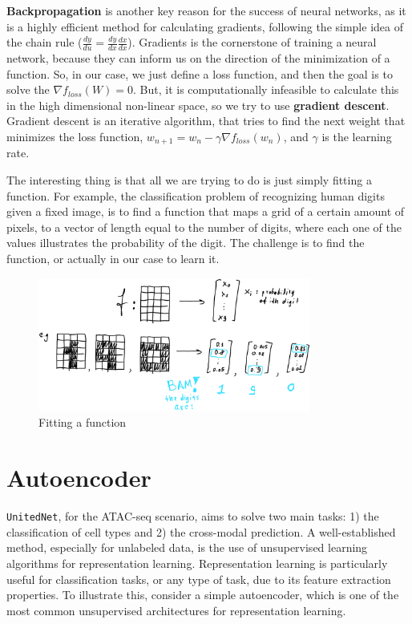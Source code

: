 \documentclass[12pt, a4paper]{article}
\begin{document}
\textbf{Backpropagation} is another key reason for the success of neural networks, as it is a highly efficient method for calculating gradients, following the simple idea of the chain rule ($\frac{dy}{du} = \frac{dy}{dx} \frac{dx}{dx}$). Gradients is the cornerstone of training a neural network, because they can inform us on the direction of the minimization of a function. So, in our case, we just define a loss function, and then the goal is to solve the $\nabla f_{loss}(W) = 0$. But, it is computationally infeasible to calculate this in the high dimensional non-linear space, so we try to use \textbf{gradient descent}. Gradient descent is an iterative algorithm, that tries to find the next weight that minimizes the loss function, $w_{n+1} = w_{n} - \gamma \nabla f_{loss}(w_n)$, and $\gamma$ is the learning rate.


The interesting thing is that all we are trying to do is just simply fitting a function. For example, the classification problem of recognizing human digits given a fixed image, is to find a function that maps a grid of a certain amount of pixels, to a vector of length equal to the number of digits, where each one of the values illustrates the probability of the digit. The challenge is to find the function, or actually in our case to learn it.

\begin{figure}[h!]
  \centering
  \includegraphics[width=0.8\textwidth]{fit_function.png}
  \caption{Fitting a function}
\end{figure}

\clearpage



\section{Autoencoder}

\verb|UnitedNet|, for the ATAC-seq scenario, aims to solve two main tasks: 1) the classification of cell types and 2) the cross-modal prediction. A well-established method, especially for unlabeled data, is the use of unsupervised learning algorithms for representation learning. Representation learning is particularly useful for classification tasks, or any type of task, due to its feature extraction properties. To illustrate this, consider a simple autoencoder, which is one of the most common unsupervised architectures for representation learning.
\end{document}

